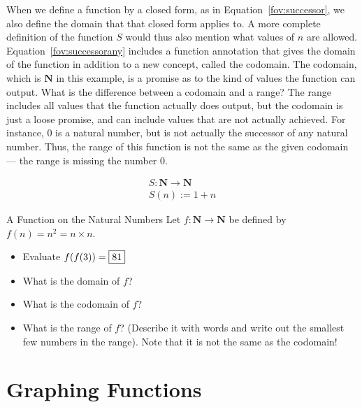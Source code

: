 \documentclass[a4paper,10pt]{report}
\begin{document}
When we define a function by a closed form, as in Equation~\ref{fov:successor}, we also
define the domain that that closed form applies to. A more complete definition of the
function \(S\) would thus also mention what values of \(n\) are allowed.
Equation~\ref{fov:successorany} includes a function annotation that gives the domain of the
function in addition to a new concept, called the codomain. The codomain, which is
\(\mathbf{N}\) in this example, is a promise as to the kind of values the function can
output. What is the difference between a codomain and a range? The range includes all values
that the function actually does output, but the codomain is just a loose promise, and can
include values that are not actually achieved. For instance, \(0\) is a natural number, but
is not actually the successor of any natural number. Thus, the range of this function is
not the same as the given codomain --- the range is missing the number \(0\).

\begin{equation}
  \begin{array}{l}
    S: \mathbf{N} \to \mathbf{N} \\
    S(n) := 1 + n
  \end{array}
  \label{fov:successorany}
\end{equation}

\begin{problem}{A Function on the Natural Numbers}
  Let \(f: \mathbf{N} \to \mathbf{N}\) be defined by \(f(n) = n^2 = n\times n\).

  \begin{itemize}
    \item Evaluate \(f(f(3)) = \Ans{81}\)
    \item What is the domain of \(f\)? \hfill {}
    \item What is the codomain of \(f\)? \hfill {}
    \item What is the range of \(f\)? (Describe it with words and write out the smallest few
    numbers in the range). Note that it is not the same
    as the codomain!
  \end{itemize}
\end{problem}

\section{Graphing Functions}
\end{document}
